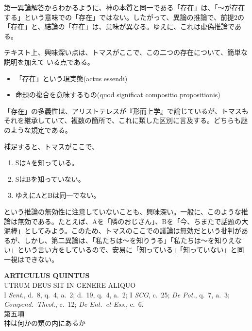 \documentclass[paper=a4paper,fontsize=10pt,jafontsize=9pt,titlepage]{jlreq}
\begin{document}
第一異論解答からわかるように、神の本質と同一である「存在」は、「〜が存在
する」という意味での「存在」ではない。したがって、異論の推論で、前提2の
「存在」と、結論の「存在」は、意味が異なる。ゆえに、これは虚偽推論である。

テキスト上、興味深い点は、トマスがここで、この二つの存在について、簡単な説明を加えて
いる点である。
\begin{itemize}
 \item 「存在」という現実態(actus essendi)
 \item 命題の複合を意味するもの(quod significat compositio propositionis)
\end{itemize}

\noindent
「存在」の多義性は、アリストテレスが『形而上学』で論じているが、トマスも
それを継承していて、複数の箇所で、これに類した区別に言及する。どちらも謎
のような規定である。

補足すると、トマスがここで、
\begin{enumerate}
 \item SはAを知っている。
 \item SはBを知っていない。
 \item ゆえにAとBは同一でない。
\end{enumerate}
\noindent
という推論の無効性に注意していないことも、興味深い。一般に、このような推
論は無効である。たとえば、Aを「隣のおじさん」、Bを「今、ちまたで話題の大
泥棒」としてみよう。このため、トマスのここでの議論は無効だという批判があ
るが、しかし、第二異論は、「私たちは〜を知りうる」「私たちは〜を知りえな
い」という言い方をしているので、安易に「知っている」「知っていない」と同
一視はできない。



\newpage
{}
\begin{center}
 {\Large {\bfseries ARTICULUS QUINTUS}}\\
 {\large UTRUM DEUS SIT IN GENERE ALIQUO}\\
 {\footnotesize I {\itshape Sent.}, d.~8, q.~4, a.~2; d.~19, q.~4, a.~2;
 I {\itshape SCG}, c.~25; {\itshape De Pot.}, q.~7, a.~3; {\itshape
 Compend.~Theol.}, c.~12; {\itshape De Ent.~et Ess.}, c.~6.}\\
 {\Large 第五項\\神は何かの類の内にあるか}
\end{center}
\end{document}
